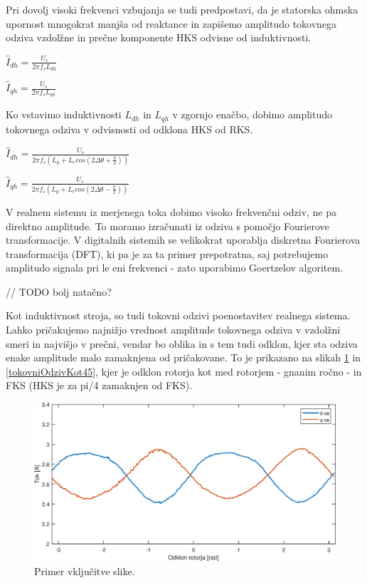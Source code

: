 \documentclass[a4paper,twoside,openright,12pt,slovene]{book}
\begin{document}
Pri dovolj visoki frekvenci vzbujanja se tudi predpostavi, da je statorska ohmska upornost mnogokrat manjša od reaktance in zapišemo amplitudo tokovnega odziva vzdolžne in prečne komponente HKS
odvisne od induktivnosti.

\begin{center}
    $\hat{I}_{dh} = \frac{U_s}{2\pi f_sL_{dh}}$
\end{center}

\begin{center}
    $\hat{I}_{qh} = \frac{U_s}{2\pi f_sL_{qh}}$
\end{center}

Ko vstavimo induktivnosti $L_{dh}$ in $L_{qh}$ v zgornjo enačbo, dobimo amplitudo tokovnega odziva v odvisnosti od odklona HKS od RKS.
\begin{center}
    $\hat{I}_{dh} = \frac{U_s}{2\pi f_s (L_p + L_r cos(2\Delta\theta + \frac{\pi}{2}))}$
\end{center}

\begin{center}
    $\hat{I}_{qh} = \frac{U_s}{2\pi f_s (L_p + L_r cos(2\Delta\theta - \frac{\pi}{2}))}$
\end{center}

V realnem sistemu iz merjenega toka dobimo visoko frekvenčni odziv, ne pa direktno amplitude. To moramo izračunati iz odziva s pomočjo Fourierove transformacije. V digitalnih sistemih se velikokrat
uporablja diskretna Fourierova transformacija (DFT), ki pa je za ta primer prepotratna, saj potrebujemo amplitudo signala pri le eni frekvenci - zato uporabimo Goertzelov algoritem.

// TODO bolj natačno?

Kot induktivnost stroja, so tudi tokovni odzivi poenostavitev realnega sistema. Lahko pričakujemo najnižjo vrednost amplitude tokovnega odziva v vzdolžni smeri in najvišjo v prečni, vendar bo oblika
in s tem tudi odklon, kjer sta odziva enake amplitude malo zamaknjena od pričakovane. To je prikazano na slikah \ref{tokovniOdzivKot0} in \ref{tokovniOdzivKot45}, kjer je odklon rotorja kot med
rotorjem - gnanim ročno - in FKS (HKS je za pi/4 zamaknjen od FKS).

\begin{figure}[!htbp]
    \centering
    \includegraphics[width=1\columnwidth]{Slike/tokovniOdzivKot0.eps}
    \caption{\label{tokovniOdzivKot0} Primer vključitve slike.}
\end{figure}
\end{document}
